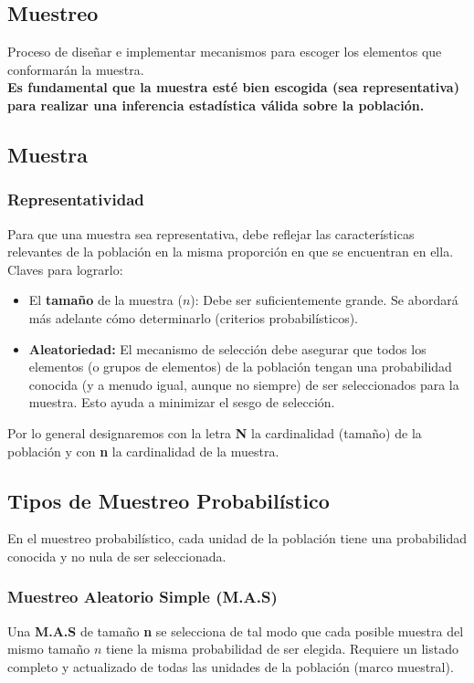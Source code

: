 \documentclass[12pt, letterpaper]{article}
\begin{document}
\subsection{Muestreo}
Proceso de diseñar e implementar mecanismos para escoger los elementos que conformarán la muestra. \\
\textbf{Es fundamental que la muestra esté bien escogida (sea representativa) para realizar una inferencia estadística válida sobre la población.}

\subsection{Muestra}
\subsubsection{Representatividad}
Para que una muestra sea representativa, debe reflejar las características relevantes de la población en la misma proporción en que se encuentran en ella. Claves para lograrlo:
\begin{itemize}
    \item El \textbf{tamaño} de la muestra ($n$): Debe ser suficientemente grande. Se abordará más adelante cómo determinarlo (criterios probabilísticos).
    \item \textbf{Aleatoriedad:} El mecanismo de selección debe asegurar que todos los elementos (o grupos de elementos) de la población tengan una probabilidad conocida (y a menudo igual, aunque no siempre) de ser seleccionados para la muestra. Esto ayuda a minimizar el sesgo de selección.
\end{itemize}
Por lo general designaremos con la letra \textbf{N} la cardinalidad (tamaño) de la población y con \textbf{n} la cardinalidad de la muestra.

\subsection{Tipos de Muestreo Probabilístico}
En el muestreo probabilístico, cada unidad de la población tiene una probabilidad conocida y no nula de ser seleccionada.
\subsubsection{Muestreo Aleatorio Simple (M.A.S)}
Una \textbf{M.A.S} de tamaño \textbf{n} se selecciona de tal modo que cada posible muestra del mismo tamaño $n$ tiene la misma probabilidad de ser elegida. Requiere un listado completo y actualizado de todas las unidades de la población (marco muestral).
\end{document}
